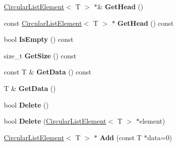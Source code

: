 \begin{DoxyCompactItemize}
\item 
\hypertarget{class_h_a_c_d_1_1_circular_list_ae6a58318f081cec0acb0fcdc2080ec7b}{\hyperlink{class_h_a_c_d_1_1_circular_list_element}{Circular\+List\+Element}$<$ T $>$ $\ast$\& {\bfseries Get\+Head} ()}\label{class_h_a_c_d_1_1_circular_list_ae6a58318f081cec0acb0fcdc2080ec7b}

\item 
\hypertarget{class_h_a_c_d_1_1_circular_list_a9b77e86ffa802612b072cac951d2cc62}{const \hyperlink{class_h_a_c_d_1_1_circular_list_element}{Circular\+List\+Element}$<$ T $>$ $\ast$ {\bfseries Get\+Head} () const }\label{class_h_a_c_d_1_1_circular_list_a9b77e86ffa802612b072cac951d2cc62}

\item 
\hypertarget{class_h_a_c_d_1_1_circular_list_af4f3d22b0108c18de5c6b1e0bbf7b72c}{bool {\bfseries Is\+Empty} () const }\label{class_h_a_c_d_1_1_circular_list_af4f3d22b0108c18de5c6b1e0bbf7b72c}

\item 
\hypertarget{class_h_a_c_d_1_1_circular_list_a184d34f3c5f39d44c69785d16dd00b8e}{size\+\_\+t {\bfseries Get\+Size} () const }\label{class_h_a_c_d_1_1_circular_list_a184d34f3c5f39d44c69785d16dd00b8e}

\item 
\hypertarget{class_h_a_c_d_1_1_circular_list_a533eed8c5a5a608d02ebe3f871062210}{const T \& {\bfseries Get\+Data} () const }\label{class_h_a_c_d_1_1_circular_list_a533eed8c5a5a608d02ebe3f871062210}

\item 
\hypertarget{class_h_a_c_d_1_1_circular_list_ad94be816fa02a9a181a9d82ae973272b}{T \& {\bfseries Get\+Data} ()}\label{class_h_a_c_d_1_1_circular_list_ad94be816fa02a9a181a9d82ae973272b}

\item 
\hypertarget{class_h_a_c_d_1_1_circular_list_a91805408f89079c60e8d3ef2f454682a}{bool {\bfseries Delete} ()}\label{class_h_a_c_d_1_1_circular_list_a91805408f89079c60e8d3ef2f454682a}

\item 
\hypertarget{class_h_a_c_d_1_1_circular_list_aa2a09039ad97faefeeb48619b6e7aa51}{bool {\bfseries Delete} (\hyperlink{class_h_a_c_d_1_1_circular_list_element}{Circular\+List\+Element}$<$ T $>$ $\ast$element)}\label{class_h_a_c_d_1_1_circular_list_aa2a09039ad97faefeeb48619b6e7aa51}

\item 
\hypertarget{class_h_a_c_d_1_1_circular_list_acfbefd61a8ef58ad8d455e5ea69f127b}{\hyperlink{class_h_a_c_d_1_1_circular_list_element}{Circular\+List\+Element}$<$ T $>$ $\ast$ {\bfseries Add} (const T $\ast$data=0)}\label{class_h_a_c_d_1_1_circular_list_acfbefd61a8ef58ad8d455e5ea69f127b}


\end{DoxyCompactItemize}
